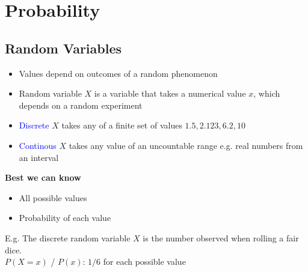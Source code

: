 \section{Probability}
\subsection{Random Variables}
\begin{itemize}
    \item Values depend on outcomes of a random phenomenon
    \item Random variable $X$ is a variable that takes a numerical value $x$, which depends on a random experiment
    \item \textcolor{blue}{Discrete} $X$ takes any of a finite set of values ${1.5, 2.123, 6.2, 10}$
    \item \textcolor{blue}{Continous} $X$ takes any value of an uncountable range e.g. real numbers from an interval
\end{itemize}
\textbf{Best we can know}
\begin{itemize}
    \item All possible values
    \item Probability of each value
\end{itemize}
E.g. The discrete random variable $X$ is the number observed when rolling a fair dice.\\
$P(X=x)$ / $P(x)$: $1/6$ for each possible value

